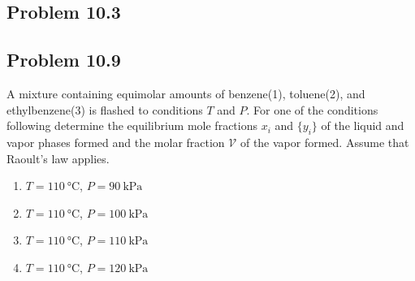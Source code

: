 \documentclass{article}
\begin{document}
\subsection*{Problem 10.3}

\subsection*{Problem 10.9}
A mixture containing equimolar amounts of benzene(1), toluene(2), and
ethylbenzene(3) is flashed to conditions $T$ and $P$. For one of the
conditions following determine the equilibrium mole fractions
{$x_{i}$} and $\{y_{i}\}$ of the liquid and vapor phases formed and
the molar fraction $\mathcal{V}$ of the vapor formed. Assume that
Raoult's law applies.
\begin{enumerate}[label=(\alph*)]
  \item $T=110~\unit{\degreeCelsius}$, $P=90~\unit{\kilo\pascal}$
  \item $T=110~\unit{\degreeCelsius}$, $P=100~\unit{\kilo\pascal}$
  \item $T=110~\unit{\degreeCelsius}$, $P=110~\unit{\kilo\pascal}$
  \item $T=110~\unit{\degreeCelsius}$, $P=120~\unit{\kilo\pascal}$
\end{enumerate}
\end{document}
